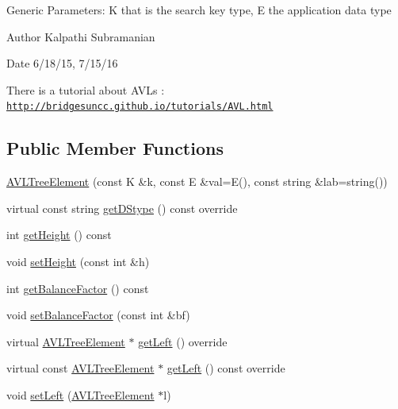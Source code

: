 Generic Parameters\+: K that is the search key type, E the application data type

\begin{DoxyAuthor}{Author}
Kalpathi Subramanian 
\end{DoxyAuthor}
\begin{DoxyDate}{Date}
6/18/15, 7/15/16
\end{DoxyDate}
There is a tutorial about A\+V\+Ls \+: \href{http://bridgesuncc.github.io/tutorials/AVL.html}{\tt http\+://bridgesuncc.\+github.\+io/tutorials/\+A\+V\+L.\+html} \subsection*{Public Member Functions}
\begin{DoxyCompactItemize}
\item 
\hyperlink{classbridges_1_1datastructure_1_1_a_v_l_tree_element_a611fc818eeb478e330ef585adcefd9e6}{A\+V\+L\+Tree\+Element} (const K \&k, const E \&val=E(), const string \&lab=string())
\item 
virtual const string \hyperlink{classbridges_1_1datastructure_1_1_a_v_l_tree_element_ab04d1e9ad4630e408041e8137dc9854a}{get\+D\+Stype} () const override
\item 
int \hyperlink{classbridges_1_1datastructure_1_1_a_v_l_tree_element_a5d4b990d49f6f3d2f23f4dd3e57414e8}{get\+Height} () const
\item 
void \hyperlink{classbridges_1_1datastructure_1_1_a_v_l_tree_element_af387bcd2b37b7284ea983acafecff93c}{set\+Height} (const int \&h)
\item 
int \hyperlink{classbridges_1_1datastructure_1_1_a_v_l_tree_element_ade3c059448d00ac50dac89e59864b11f}{get\+Balance\+Factor} () const
\item 
void \hyperlink{classbridges_1_1datastructure_1_1_a_v_l_tree_element_a32af51a86585479c28de425374df95e9}{set\+Balance\+Factor} (const int \&bf)
\item 
virtual \hyperlink{classbridges_1_1datastructure_1_1_a_v_l_tree_element}{A\+V\+L\+Tree\+Element} $\ast$ \hyperlink{classbridges_1_1datastructure_1_1_a_v_l_tree_element_ab05925e343b9fa71b61c71e8034e1293}{get\+Left} () override
\item 
virtual const \hyperlink{classbridges_1_1datastructure_1_1_a_v_l_tree_element}{A\+V\+L\+Tree\+Element} $\ast$ \hyperlink{classbridges_1_1datastructure_1_1_a_v_l_tree_element_a4a639e0c623435aadf5c51ed132cb25d}{get\+Left} () const override
\item 
void \hyperlink{classbridges_1_1datastructure_1_1_a_v_l_tree_element_af6c8a71789ff45481786fd4d63cbbcbe}{set\+Left} (\hyperlink{classbridges_1_1datastructure_1_1_a_v_l_tree_element}{A\+V\+L\+Tree\+Element} $\ast$l)

\end{DoxyCompactItemize}

